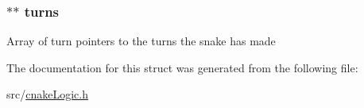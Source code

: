 \subsubsection[{\texorpdfstring{turns}{turns}}]{$\ast$$\ast$ turns}\hypertarget{struct_snake_af820fd5b127c523ce57ad98829dfe29f}{}\label{struct_snake_af820fd5b127c523ce57ad98829dfe29f}
Array of turn pointers to the turns the snake has made 

The documentation for this struct was generated from the following file\+:\begin{DoxyCompactItemize}
\item 
src/\hyperlink{cnake_logic_8h}{cnake\+Logic.\+h}\end{DoxyCompactItemize}
